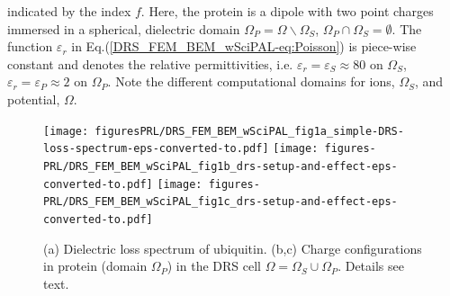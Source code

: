 \documentclass[runningheads]{lncse}
\newcommand{\mydiff}[2]{{}{#2}}
\begin{document}
 indicated by the index $f$.
%
\mydiff{}{%
Here, the protein is a dipole with two point charges immersed in a spherical, dielectric domain $\Omega_P= \Omega \backslash \Omega_S$, $\Omega_P \cap \Omega_S = \emptyset$.
%
The function $\varepsilon_r$ in Eq.(\ref{DRS_FEM_BEM_wSciPAL-eq:Poisson}) is piece-wise constant and denotes the relative permittivities, i.e. $\varepsilon_r = \varepsilon_S \approx 80$ on $\Omega_S$,
$\varepsilon_r = \varepsilon_P \approx 2$ on $\Omega_P$.
%
Note the different computational domains for
ions, $\Omega_S$, and 
potential, $\Omega$.}
\begin{figure}[t]
\centering
\subfloat
{
\texttt{[image: figuresPRL/DRS\_FEM\_BEM\_wSciPAL\_fig1a\_simple-DRS-loss-spectrum-eps-converted-to.pdf]}
 \label{DRS_FEM_BEM_wSciPAL-fig:diel-loss-spec}
 }
 \subfloat
 {
\texttt{[image: figures-PRL/DRS\_FEM\_BEM\_wSciPAL\_fig1b\_drs-setup-and-effect-eps-converted-to.pdf]}
\label{DRS_FEM_BEM_wSciPAL-fig:protein-state-a}
}
 \subfloat
 {
\texttt{[image: figures-PRL/DRS\_FEM\_BEM\_wSciPAL\_fig1c\_drs-setup-and-effect-eps-converted-to.pdf]}
 \label{DRS_FEM_BEM_wSciPAL-fig:protein-state-b}
 }
%
\caption{
\mydiff{
DRS cell with subdomains $\Omega_P$ (protein interior) and $\Omega_S$ (solvent). 
%
The boundaries are $\Gamma$ (protein-solvent interface),  $\Gamma_A$ (anode), $\Gamma_C$ (cathode) and $\Gamma_0$ (impermeable hull of the DRS cell). 
%
The protein is modeled as a dipole consisting of two point charges immersed in a spherical, dielectric domain of relative permittivity $\varepsilon_P \approx 2$ while the aqueous surrounding has $\varepsilon_S \approx 80$. 
%
Depending on the intramolecular charge distribution, i.e.  conformation, of the protein a different number of ions is bound in the dielectric double layer at $\Gamma$. 
}
{(a) Dielectric loss spectrum of ubiquitin.
(b,c) Charge configurations in protein (domain $\Omega_P$) in the DRS cell $\Omega = \Omega_S \cup \Omega_P$.
%
%
Details see text.
}
}
\label{DRS_FEM_BEM_wSciPAL-fig:drs-setup-and-effect}    
\end{figure}
\end{document}
